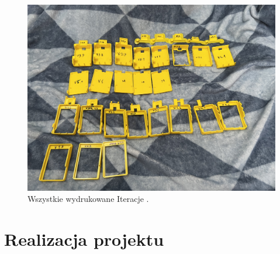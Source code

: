\documentclass[a4paper,12pt,reqno]{article}
\begin{document}
\begin{figure}[H]%
\centering
\includegraphics[width=0.8\columnwidth]{imgs/print_all.jpg}
\caption{Wszystkie wydrukowane Iteracje \cite{img_me}. \label{PDCA_ALL}}
\quad
\end{figure}

\section{Realizacja projektu} \label{section:realizacja}
\end{document}
